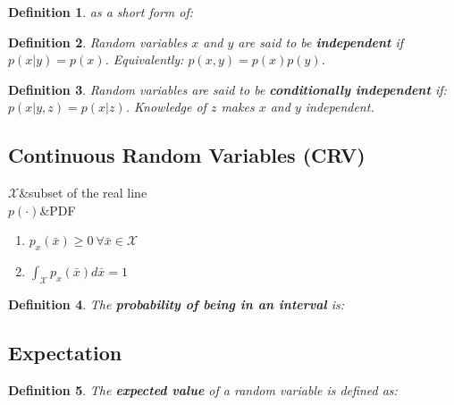 \documentclass[10pt,a4paper]{scrartcl}
\newtheorem{define}{Definition}
\begin{document}
\begin{multicols*}{2}
\begin{define}

as a short form of:

\end{define}

\begin{define}
Random variables $x$ and $y$ are said to be \textbf{independent} if $p(x|y)=p(x)$. Equivalently: $p(x,y)=p(x)p(y)$.
\end{define}

\begin{define}
Random variables are said to be \textbf{conditionally independent} if: $p(x|y,z)=p(x|z)$. Knowledge of $z$ makes $x$ and $y$ independent.
\end{define}

\subsection{Continuous Random Variables (CRV)}

\begin{TDefinitionTable*}
$\mathcal{X}$&subset of the real line\\
$p(\cdot)$&PDF
\end{TDefinitionTable*}

\begin{enumerate}
\item $p_x(\bar{x})\geq 0\ \forall\bar{x}\in\mathcal{X}$
\item $\int_{\mathcal{X}}p_x(\bar{x})d\bar{x}=1$
\end{enumerate}

\begin{define}
The \textbf{probability of being in an interval} is:

\end{define}

\subsection{Expectation}

\begin{define}
The \textbf{expected value} of a random variable is defined as:

\end{define}


\end{multicols*}
\end{document}
